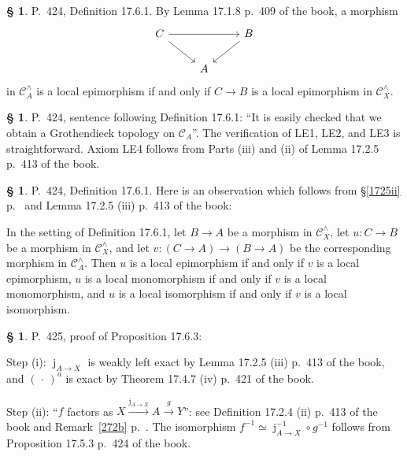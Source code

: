 \documentclass[12pt]{article}%
\theoremstyle{remark}
\theoremstyle{definition}
\newtheorem{s}[thm]{\S}%
\newcommand{\oo}{\operatorname}
\newcommand{\C}{\mathcal C}
\newcommand{\xr}{\xrightarrow}
\begin{document}
%

\begin{s}\label{1761}
P.~424, Definition 17.6.1. By Lemma 17.1.8 p.~409 of the book, a morphism 
$$
\begin{tikzcd} 
C\ar{rr}\ar{dr}&&B\ar{dl}\\ 
{}&A
\end{tikzcd}
$$ 
in $\C_A^\wedge$ is a local epimorphism if and only if $C\to B$ is a local epimorphism in $\C_X^\wedge$.
\end{s}

%

\begin{s}
P.~424, sentence following Definition 17.6.1: ``It is easily checked that we obtain a Grothendieck topology on $\C_A$''. The verification  of LE1, LE2, and LE3 is straightforward. Axiom LE4 follows from Parts (iii) and (ii) of Lemma 17.2.5 p.~413 of the book.
\end{s} 

%

\begin{s}\label{1761b} 
P.~424, Definition 17.6.1. Here is an observation which follows from \S\ref{1725ii} p.~\pageref{1725ii} and Lemma 17.2.5 (iii) p.~413 of the book: 

In the setting of Definition 17.6.1, let $B\to A$ be a morphism in $\C_X^\wedge$, let $u:C\to B$ be a morphism in $\C_X^\wedge$, and let $v:(C\to A)\to(B\to A)$ be the corresponding morphism in $\C_A^\wedge$. Then $u$ is a local epimorphism if and only if $v$ is a local epimorphism, $u$ is a local monomorphism if and only if $v$ is a local monomorphism, and $u$ is a local isomorphism if and only if $v$ is a local isomorphism. 
\end{s} 

%

\begin{s}
P.~425, proof of Proposition 17.6.3: 

Step (i): $\oo j_{A\to X}$ is weakly left exact by Lemma 17.2.5 (iii) p.~413 of the book, and $(\,\cdot\,)^a$ is exact by Theorem 17.4.7 (iv) p.~421 of the book.

Step (ii): ``$f$ factors as $X\xr{\oo j_{A\to X}}A\xr gY$'': see Definition 17.2.4 (ii) p.~413 of the book and Remark~\ref{272b} p.~\pageref{272b}. The isomorphism $f^{-1}\simeq\oo j_{A\to X}^{-1}\circ g^{-1}$ follows from Proposition 17.5.3 p.~424 of the book.
\end{s} 

% 
\end{document}
